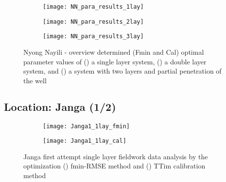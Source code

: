 \begin{figure}[h!]
	\centering
	\begin{subfigure}[b]{\linewidth}
		\centering\texttt{[image: NN\_para\_results\_1lay]}
		\captionsetup{justification=centering}		
		\caption{\label{fig:NN_para_results_1lay}}
		\end{subfigure}\vfill
	\begin{subfigure}[b]{\linewidth}
		\centering\texttt{[image: NN\_para\_results\_2lay]}
		\captionsetup{justification=centering}		
		\caption{\label{fig:NN_para_results_2lay}}
		\end{subfigure}
	\begin{subfigure}[b]{\linewidth}
		\centering\texttt{[image: NN\_para\_results\_3lay]}
		\captionsetup{justification=centering}		
		\caption{\label{fig:NN_para_results_3lay}}
		\end{subfigure}		
	\captionsetup{justification=centering}	
	\caption{Nyong Nayili - overview determined (Fmin and Cal) optimal parameter values of () a single layer system, () a double layer system, and () a system with two layers and partial penetration of the well} 
	\label{fig:NN_para_results}
\end{figure} 


\clearpage\subsection{Location: Janga (1/2)}
\label{subsec:Janga1_overview}

\begin{figure}[h!]
	\centering
	\begin{subfigure}[b]{0.65\linewidth}
		\centering\texttt{[image: Janga1\_1lay\_fmin]}
		\captionsetup{justification=centering}		
		\caption{\label{fig:Janga1_1lay_fmin}}
		\end{subfigure}\vfill
	\begin{subfigure}[b]{0.65\linewidth}
		\centering\texttt{[image: Janga1\_1lay\_cal]}
		\captionsetup{justification=centering}		
		\caption{\label{fig:Janga1_1lay_cal}}
		\end{subfigure}
	\captionsetup{justification=centering}	
	\caption{Janga first attempt single layer fieldwork data analysis by the optimization () fmin-RMSE method and () TTim calibration method} 
	\label{fig:Janga1_1lay_analysis}
\end{figure} 

